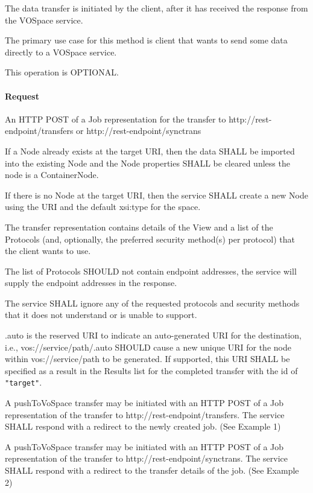\documentclass[11pt,a4paper]{ivoa}
\begin{document}
The data transfer is initiated by the client, after it has received the response from the VOSpace service.

The primary use case for this method is client that wants to send some data directly to a VOSpace service.

This operation is OPTIONAL.

\paragraph{Request}
An HTTP POST of a Job representation for the transfer to http://rest-endpoint/transfers or http://rest-endpoint/synctrans

If a Node already exists at the target URI, then the data SHALL be imported into the existing Node and the Node properties SHALL be cleared unless the node is a ContainerNode.

If there is no Node at the target URI, then the service SHALL create a new Node using the URI and the default xsi:type for the space.

The transfer representation contains details of the View and a list of the Protocols (and, optionally, the preferred security method(s) per protocol) that the client wants to use.

The list of Protocols SHOULD not contain endpoint addresses, the service will supply the endpoint addresses in the response.

The service SHALL ignore any of the requested protocols and security methods that it does not understand or is unable to support.

.auto is the reserved URI to indicate an auto-generated URI for the destination, i.e., vos://service/path/.auto SHOULD cause a new unique URI for the node within vos://service/path to be generated.  If supported, this URI SHALL be specified as a result in the Results list for the completed transfer with the id of \verb|"target"|.

A pushToVoSpace transfer may be initiated with an HTTP POST of a Job representation of the transfer to http://rest-endpoint/transfers. The service SHALL respond with a redirect to the newly created job.  (See Example 1)

A pushToVoSpace transfer may be initiated with an HTTP POST of a Job representation of the transfer to http://rest-endpoint/synctrans. The service SHALL respond with a redirect to the transfer details of the job.  (See Example 2)
\end{document}
